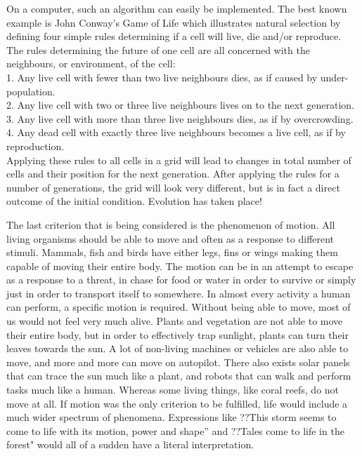 On a computer, such an algorithm can easily be implemented. The best known example is John Conway's Game of Life \cite{Conway} which illustrates natural selection by defining four simple rules determining if a cell will live, die and/or reproduce. The rules determining the future of one cell are all concerned with the neighbours, or environment, of the cell: \\
1. Any live cell with fewer than two live neighbours dies, as if caused by under-population. \\
2. Any live cell with two or three live neighbours lives on to the next generation. \\
3. Any live cell with more than three live neighbours dies, as if by overcrowding. \\
4. Any dead cell with exactly three live neighbours becomes a live cell, as if by reproduction. \\
Applying these rules to all cells in a grid will lead to changes in total number of cells and their position for the next generation. After applying the rules for a number of generations, the grid will look very different, but is in fact a direct outcome of the initial condition. Evolution has taken place!

The last criterion that is being considered is the phenomenon of motion. All living organisms should be able to move and often as a response to different stimuli. Mammals, fish and birds have either legs, fins or wings making them capable of moving their entire body. The motion can be in an attempt to escape as a response to a threat, in chase for food or water in order to survive or simply just in order to transport itself to somewhere. In almost every activity a human can perform, a specific motion is required. Without being able to move, most of us would not feel very much alive. Plants and vegetation are not able to move their entire body, but in order to effectively trap sunlight, plants can turn their leaves towards the sun. A lot of non-living machines or vehicles are also able to move, and more and more can move on autopilot. There also exists solar panels that can trace the sun much like a plant, and robots that can walk and perform tasks much like a human. Whereas some living things, like coral reefs, do not move at all. If motion was the only criterion to be fulfilled, life would include a much wider spectrum of phenomena. Expressions like ??This storm seems to come to life with its motion, power and shape'' and ??Tales come to life in the forest" would all of a sudden have a literal interpretation. 

